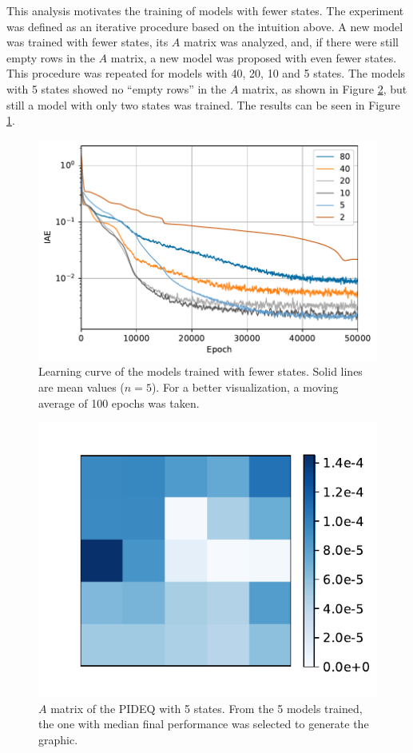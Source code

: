 This analysis motivates the training of models with fewer states.
The experiment was defined as an iterative procedure based on the intuition above.
A new model was trained with fewer states, its $A$ matrix was analyzed, and, if there were still empty rows in the $A$ matrix, a new model was proposed with even fewer states.
This procedure was repeated for models with 40, 20, 10 and 5 states.
The models with 5 states showed no ``empty rows'' in the $A$ matrix, as shown in Figure \ref{fig:mat-pideq-5}, but still a model with only two states was trained.
The results can be seen in Figure \ref{fig:states-iae}.

\begin{figure}[h]
    \centering
    \includegraphics{images/exp_2_iae.pdf}
    \caption[Learning curve of the models trained with fewer states.]{Learning curve of the models trained with fewer states. Solid lines are mean values ($n=5$). For a better visualization, a moving average of 100 epochs was taken.}
    \label{fig:states-iae}
\end{figure}

\begin{figure}[h]
    \centering
    \includegraphics{images/exp_2_matplot.pdf}
    \caption{$A$ matrix of the \gls{PIDEQ} with 5 states. From the 5 models trained, the one with median final performance was selected to generate the graphic.}
    \label{fig:mat-pideq-5}
\end{figure}

